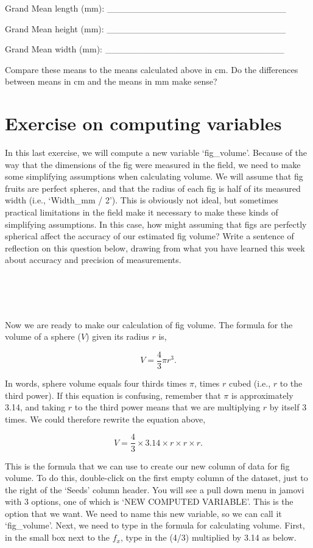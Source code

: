 \documentclass[
]{scrbook}
\begin{document}
Grand Mean length (mm): \_\_\_\_\_\_\_\_\_\_\_\_\_\_\_\_\_\_\_\_\_\_\_\_\_\_\_\_

Grand Mean height (mm): \_\_\_\_\_\_\_\_\_\_\_\_\_\_\_\_\_\_\_\_\_\_\_\_\_\_\_\_

Grand Mean width (mm): \_\_\_\_\_\_\_\_\_\_\_\_\_\_\_\_\_\_\_\_\_\_\_\_\_\_\_\_

Compare these means to the means calculated above in cm.
Do the differences between means in cm and the means in mm make sense?

\hypertarget{computing_variables_02}{%
\section{Exercise on computing variables}\label{computing_variables_02}}

In this last exercise, we will compute a new variable `fig\_volume'.
Because of the way that the dimensions of the fig were measured in the field, we need to make some simplifying assumptions when calculating volume.
We will assume that fig fruits are perfect spheres, and that the radius of each fig is half of its measured width (i.e., `Width\_mm / 2').
This is obviously not ideal, but sometimes practical limitations in the field make it necessary to make these kinds of simplifying assumptions.
In this case, how might assuming that figs are perfectly spherical affect the accuracy of our estimated fig volume?
Write a sentence of reflection on this question below, drawing from what you have learned this week about accuracy and precision of measurements.

\begin{verbatim}




\end{verbatim}

Now we are ready to make our calculation of fig volume.
The formula for the volume of a sphere (\(V\)) given its radius \(r\) is,

\[V = \frac{4}{3} \pi r^{3}.\]

In words, sphere volume equals four thirds times \(\pi\), times \(r\) cubed (i.e., \(r\) to the third power).
If this equation is confusing, remember that \(\pi\) is approximately 3.14, and taking \(r\) to the third power means that we are multiplying \(r\) by itself 3 times.
We could therefore rewrite the equation above,

\[V = \frac{4}{3} \times 3.14 \times r \times r \times r.\]

This is the formula that we can use to create our new column of data for fig volume.
To do this, double-click on the first empty column of the dataset, just to the right of the `Seeds' column header.
You will see a pull down menu in jamovi with 3 options, one of which is `NEW COMPUTED VARIABLE'.
This is the option that we want.
We need to name this new variable, so we can call it `fig\_volume'.
Next, we need to type in the formula for calculating volume.
First, in the small box next to the \(f_{x}\), type in the (4/3) multiplied by 3.14 as below.
\end{document}
